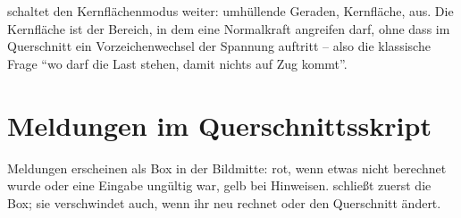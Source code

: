  schaltet den Kernflächenmodus weiter: umhüllende Geraden, Kernfläche, aus. Die
Kernfläche ist der Bereich, in dem eine Normalkraft angreifen darf, ohne dass im Querschnitt ein
Vorzeichenwechsel der Spannung auftritt -- also die klassische Frage \enquote{wo darf die Last
stehen, damit nichts auf Zug kommt}.

\section{Meldungen im Querschnittsskript}

Meldungen erscheinen als Box in der Bildmitte: rot, wenn etwas nicht berechnet wurde oder eine
Eingabe ungültig war, gelb bei Hinweisen.  schließt zuerst die Box; sie verschwindet
auch, wenn ihr neu rechnet oder den Querschnitt ändert.

